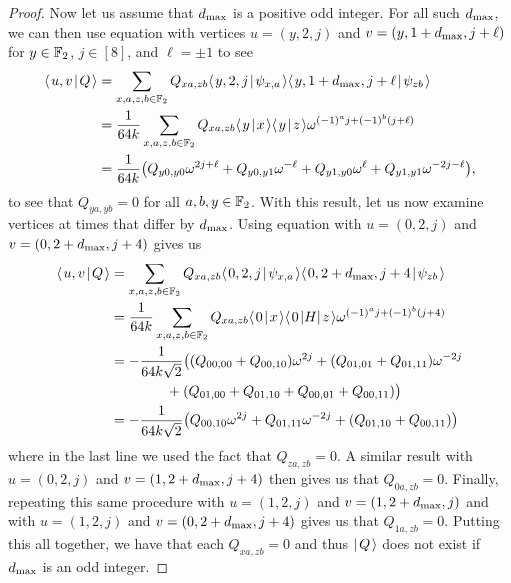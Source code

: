 \documentclass[../thesis-main/thesis-main]{subfiles}
\begin{document}
\begin{proof}
Now let us assume that $d_{\text{max}}$ is a positive odd integer.  For all such $d_{\text{max}}$, we can then use equation  with vertices $u =(y,2,j)$ and $v =(y,1+d_{\text{max}},j+\ell)$ for $y\in \mathbb{F}_2$, $j\in [8]$, and $\ell = \pm 1$ to see
\begin{align}
  \langle\mspace{2mu} u,v \mspace{2mu} | \mspace{2mu} Q\mspace{2mu} \rangle &= \sum_{x,a,z,b\in \mathbb{F}_2} Q_{xa,zb} \langle\mspace{2mu} y,2,j \mspace{2mu} | \mspace{2mu} \psi_{x,a}\mspace{2mu} \rangle\langle\mspace{2mu} y,1+d_{\text{max}},j+\ell \mspace{2mu} | \mspace{2mu} \psi_{zb}\mspace{2mu} \rangle\\
  &=\frac{1}{64 k} \sum_{x,a,z,b\in \mathbb{F}_2} Q_{xa,zb} \langle\mspace{2mu} y \mspace{2mu} | \mspace{2mu} x\mspace{2mu} \rangle \langle\mspace{2mu} y \mspace{2mu} | \mspace{2mu} z\mspace{2mu} \rangle \omega^{(-1)^a j+ (-1)^b (j+\ell)}\\
  &= \frac{1}{64 k} \big( Q_{y0,y0}  \omega^{2j + \ell} + Q_{y0,y1}\omega^{-\ell} + Q_{y1,y0} \omega^{\ell} + Q_{y1,y1}\omega^{-2j - \ell}\big),
\end{align}
to see that $Q_{ya,yb} = 0$ for all $a,b,y\in \mathbb{F}_2$.  With this result, let us now examine vertices at times that differ by $d_{\text{max}}$.  Using equation  with $u = (0,2,j)$ and $v = (0,2+d_{\text{max}},j+4)$ gives us
\begin{align}
  \langle\mspace{2mu} u,v \mspace{2mu} | \mspace{2mu} Q\mspace{2mu} \rangle &= \sum_{x,a,z,b\in \mathbb{F}_2} Q_{xa,zb} \langle\mspace{2mu} 0,2,j \mspace{2mu} | \mspace{2mu} \psi_{x,a}\mspace{2mu} \rangle\langle\mspace{2mu} 0,2+d_{\text{max}},j+4 \mspace{2mu} | \mspace{2mu} \psi_{zb}\mspace{2mu} \rangle\\
  &=\frac{1}{64 k} \sum_{x,a,z,b\in \mathbb{F}_2} Q_{xa,zb} \langle\mspace{2mu} 0 \mspace{2mu} | \mspace{2mu} x\mspace{2mu} \rangle \langle\mspace{2mu} 0 \mspace{2mu} |H|\mspace{2mu} z \mspace{2mu} \rangle \omega^{(-1)^a j+ (-1)^b (j+4)}\\
  &= -\frac{1}{64 k\sqrt{2}} \big((Q_{00,00}+ Q_{00,10} )  \omega^{2j} + (Q_{01,01} + Q_{01,11})\omega^{-2j}\nonumber\\
  &\qquad\qquad+(Q_{01,00} + Q_{01,10} + Q_{00,01} + Q_{00,11})\big)\\
  &= -\frac{1}{64 k \sqrt{2}} \big(Q_{00,10} \omega^{2j} + Q_{01,11} \omega^{-2j} + (Q_{01,10} + Q_{00,11})\big)
\end{align}
where in the last line we used the fact that $Q_{za,zb} = 0$.  A similar result with $u = (0,2,j)$ and $v = (1,2+d_{\text{max}}, j+4)$ then gives us that $Q_{0a,zb} = 0$.  Finally, repeating this same procedure with $u = (1,2,j)$ and $v=(1,2+d_{\text{max}},j)$ and with $u = (1,2,j)$ and $v = (0,2+d_{\text{max}}, j+4)$ gives us that $Q_{1a,zb} = 0$.  Putting this all together, we have that each $Q_{xa,zb} = 0$ and thus $|\mspace{2mu} Q \mspace{2mu} \rangle$ does not exist if $d_{\text{max}}$ is an odd integer.


\end{proof}
\end{document}
